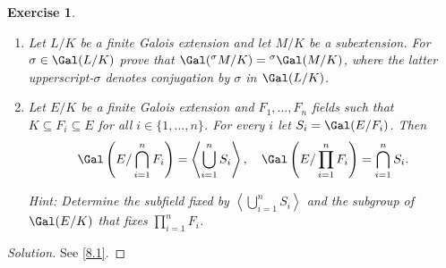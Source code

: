 \documentclass[a4paper,10pt,reqno]{amsart}
\newtheorem{ex}{Exercise}[section]
\newenvironment{sol}
  {\renewcommand\qedsymbol{$\blacksquare$}\begin{proof}[Solution]}
  {\end{proof}}
\begin{document}
\begin{ex}
\label{7.4}~

    \begin{enumerate}[label=(\roman*)]
    \item Let $L/K$ be a finite Galois extension and let $M/K$ be a subextension.
    For $\sigma \in \Gal(L/K)$ prove that $\Gal({}^{\sigma}M/K) = {}^{\sigma}\Gal(M/K)$, where the latter upperscript-$\sigma$ denotes conjugation by $\sigma$ in $\Gal(L/K)$.
    
    \item Let $E/K$ be a finite Galois extension 
    and $F_1,\dots,F_n$ fields 
    such that $K\subseteq F_i\subseteq E$ for 
    all $i\in\{1,\dots,n\}$. For every 
    $i$ let $S_i=\Gal(E/F_i)$. Then
    \[
    \Gal\left(E/\bigcap_{i=1}^nF_i\right)=\left\langle\bigcup_{i=1}^nS_i\right\rangle,
    \quad
    \Gal\left(E/\prod_{i=1}^nF_i\right)=\bigcap_{i=1}^nS_i.
    \]

    \noindent \textit{Hint:} Determine the subfield fixed by $\left\langle\bigcup_{i=1}^nS_i\right\rangle$ and the subgroup of $\Gal(E/K)$ that fixes $\prod_{i=1}^nF_i$.
    \end{enumerate}
\end{ex}
\begin{sol}
    See \cref{8.1}.
\end{sol}

\begin{comment}
\begin{ex}
    Let $L$ be a finite field of characteristic $p > 0$. We know that $|L|= p^n$ for some $n \geq 1$. We furthermore know that $L$ contains $K = \Z/p$ as a subfield. 
    \begin{enumerate}[label=(\roman*)]
        \item Use the fact that $L^{\times}$ is cyclic to prove that $L$ is a decomposition field of the polynomial $X^{p^n}-X$ over $K$.
        \item Prove that $\Gal(L/K) = \left\langle \Phi_L \right\rangle \cong C_n$ where $\Phi_L$ is the Frobenius endomorphism $x \mapsto x^p$.
        \item Show that $L/K$ is Galois and use the Galois correspondence to describe the possible sizes of the subfields $M \subseteq L$. How many are there?
    \end{enumerate}
\end{ex}
\end{comment}

\end{document}
